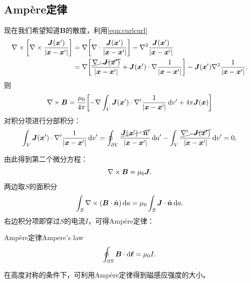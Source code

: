\subsection{Ampère定律}
\label{ssec:Ampere's law}

现在我们希望知道$\bm B$的散度，利用\eqref{eqn:curlcurl}
\begin{align*}
    \nabla\times\biggl[\nabla\times\frac{\bm J(\bm x')}{|\bm x-\bm x'|}\biggr]&=\nabla\biggl[\nabla\cdot\frac{\bm J(\bm x')}{|\bm x-\bm x'|}\biggr]-\nabla^2\frac{\bm J(\bm x')}{|\bm x-\bm x'|}\\
    &=\nabla\biggl[\frac{\cancel{\nabla\cdot\bm J(\bm x')}}{|\bm x-\bm x'|}+\bm J(\bm x')\cdot\nabla\frac1{|\bm x-\bm x'|}\biggr]-\bm J(\bm x')\nabla^2\frac1{|\bm x-\bm x'|}.
\end{align*}
则
\[
    \nabla\times\bm B=\frac{\mu_0}{4\pi}\biggl[-\nabla\int_V\bm J(\bm x')\cdot\nabla'\frac1{|\bm x-\bm x'|}\mathop{}\!\mathrm{d} v'+4\pi\bm J(\bm x)\biggr]
\]
对积分项进行分部积分：
\[
    \int_V\bm J(\bm x')\cdot\nabla'\frac1{|\bm x-\bm x'|}\mathop{}\!\mathrm{d} v'=\oint_{\partial V}\frac{\cancel{\bm J(\bm x')\cdot\mathop{}\!\hat{\bm{n}}'}}{|\bm x-\bm x'|}\mathop{}\!\mathrm{d} a'-\int_V\frac{\cancel{\nabla'\cdot\bm J(\bm x')}}{|\bm x-\bm x'|}\mathop{}\!\mathrm{d} v'=0,
\]

由此得到第二个微分方程：
\begin{equation}
    \label{eqn:curlB}
    \nabla\times\bm B=\mu_0\bm J.
\end{equation}
两边取$S$的面积分
\[
    \int_S\nabla\times(\bm B\cdot\mathop{}\!\hat{\bm{n}})\mathop{}\!\mathrm{d} a=\mu_0\int_S\bm J\cdot\mathop{}\!\hat{\bm{n}}\mathop{}\!\mathrm{d} a.
\]
右边积分项即穿过$S$的电流$I$，可得Ampère定律：
\begin{theorem}{Ampère定律}{Ampere's law}
    \begin{equation}
        \label{eqn:Ampere}
        \oint_{\partial S}\bm B\cdot\mathop{}\!\mathrm{d}\bm\ell=\mu_0I.
    \end{equation}
\end{theorem}
在高度对称的条件下，可利用Ampère定律得到磁感应强度的大小。

